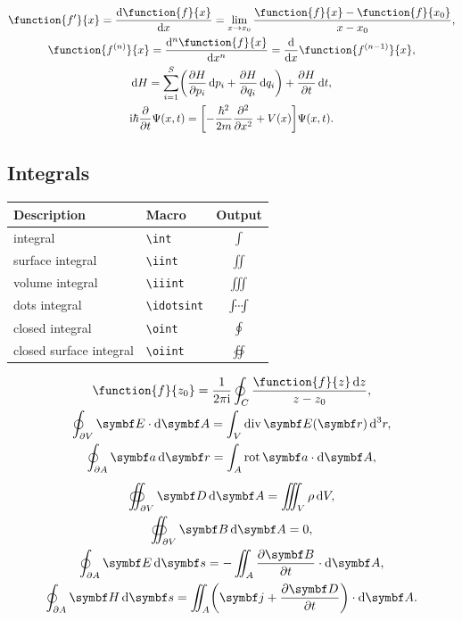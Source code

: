 \documentclass[DIV=13]{scrartcl}
\begin{document}
\begin{gather}
  \function{f^\prime}{x} = \dd{\function{f}{x}}{x} = \lim_{x\to x_0}
  \frac{\function{f}{x}-\function{f}{x_0}}{x-x_0}, \\
  \function{f^{(n)}}{x} = \dd[n]{\function{f}{x}}{x}
  = \dd{}{x}\function{f^{(n-1)}}{x}, \\
  \diff H = \sum_{i=1}^{S}\left(\pdd{H}{p_i}\diff p_i +
    \pdd{H}{q_i}\diff q_i\right) + \pdd{H}{t}\diff t, \\
  \i\hbar\pdd{}{t}\Psi(x,t) =
  \left[-\frac{\hbar^2}{2m}\pdd[2]{}{x} + V(x)\right]\Psi(x,t).
\end{gather}


\subsection{Integrals}
\begin{center}
  \begin{tabular}{llc}
    \toprule
    \textbf{Description}    & \textbf{Macro}   & \textbf{Output} \\
    \midrule
    integral                & \verb|\int|      & $\int$          \\
    surface integral        & \verb|\iint|     & $\iint$         \\
    volume integral         & \verb|\iiint|    & $\iiint$        \\
    dots integral           & \verb|\idotsint| & $\idotsint$     \\
    closed integral         & \verb|\oint|     & $\oint$         \\
    closed surface integral & \verb|\oiint|    & $\oiint$        \\
    \bottomrule
  \end{tabular}
\end{center}
\begin{gather}
  \function{f}{z_0} = \frac{1}{2\pi\i}\oint_C
  \frac{\function{f}{z}\diff z}{z-z_0}, \\
  \oint_{\partial V} \vec{E}\cdot\diff\vec{A}
  = \int_V \div\vec{E}(\vec{r})\diff^3 r, \\
  \oint_{\partial A}\vec{a}\diff\vec{r}
  = \int_A \rot\vec{a}\cdot\diff\vec{A}, \\[1ex]
  \oiint_{\partial V}\vec{D}\diff\vec{A} = \iiint_V \rho\diff V, \\
  \oiint_{\partial V}\vec{B}\diff\vec{A} = 0, \\
  \oint_{\partial A}\vec{E}\diff\vec{s}
  = -\iint_A \pdd{\vec{B}}{t}\cdot\diff\vec{A}, \\
  \oint_{\partial A}\vec{H}\diff{\vec{s}}
  = \iint_A\left(\vec{j} + \pdd{\vec{D}}{t}\right)\cdot\diff\vec{A}.
\end{gather}
\end{document}
